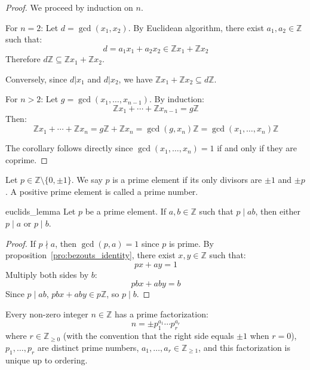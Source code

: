 \documentclass[11pt,lang=en]{elegantbook}
\begin{document}
\begin{proof}
  We proceed by induction on $n$.

  For $n=2$: Let $d = \gcd(x_1,x_2)$. By Euclidean algorithm, there exist $a_1,a_2 \in \mathbb{Z}$ such that:
  \[
    d = a_1x_1 + a_2x_2 \in \mathbb{Z}x_1 + \mathbb{Z}x_2
  \]
  Therefore $d\mathbb{Z} \subseteq \mathbb{Z}x_1 + \mathbb{Z}x_2$.

  Conversely, since $d|x_1$ and $d|x_2$, we have $\mathbb{Z}x_1 + \mathbb{Z}x_2 \subseteq d\mathbb{Z}$.

  For $n > 2$: Let $g = \gcd(x_1,\ldots,x_{n-1})$. By induction:
  \[
    \mathbb{Z}x_1 + \cdots + \mathbb{Z}x_{n-1} = g\mathbb{Z}
  \]
  Then:
  \[
    \mathbb{Z}x_1 + \cdots + \mathbb{Z}x_n = g\mathbb{Z} + \mathbb{Z}x_n = \gcd(g,x_n)\mathbb{Z} = \gcd(x_1,\ldots,x_n)\mathbb{Z}
  \]

  The corollary follows directly since $\gcd(x_1,\ldots,x_n) = 1$ if and only if they are coprime.
\end{proof}

\begin{definition}
  Let $p \in \mathbb{Z} \setminus \{0,\pm1\}$. We say $p$ is a prime element if its only divisors are $\pm1$ and $\pm p$.
  A positive prime element is called a prime number.
\end{definition}

\begin{proposition}{euclids_lemma}
  Let $p$ be a prime element. If $a,b \in \mathbb{Z}$ such that $p\mid ab$, then either $p\mid a$ or $p\mid b$.
\end{proposition}

\begin{proof}
  If $p \nmid a$, then $\gcd(p,a) = 1$ since $p$ is prime.
  By proposition~\ref{pro:bezouts_identity}, there exist $x,y \in \mathbb{Z}$ such that:
  \[
    px + ay = 1
  \]
  Multiply both sides by $b$:
  \[
    pbx + aby = b
  \]
  Since $p\mid ab$, $pbx+aby \in p\mathbb{Z}$, so $p\mid b$.
\end{proof}

\begin{theorem}
  Every non-zero integer $n \in \mathbb{Z}$ has a prime factorization:
  \[
    n = \pm p_1^{a_1}\cdots p_r^{a_r}
  \]
  where $r \in \mathbb{Z}_{\geq 0}$ (with the convention that the right side equals $\pm 1$ when $r=0$), $p_1,\ldots,p_r$ are distinct prime numbers, $a_1,\ldots,a_r \in \mathbb{Z}_{\geq 1}$, and this factorization is unique up to ordering.
\end{theorem}
\end{document}
